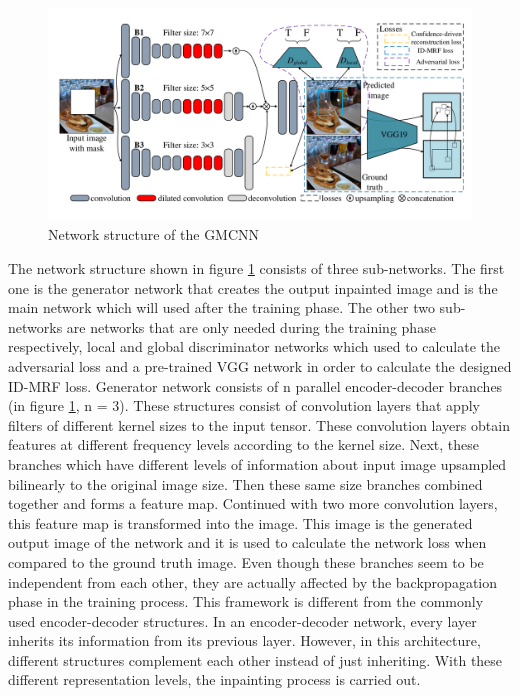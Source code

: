 \begin{figure}[h!]
    \centering
    \includegraphics[width=14cm]{figures/chapter4/gmcnn.png}
    \caption{Network structure of the GMCNN \cite{inpainting_via_multi_cnn}}
    \label{fig:gmcnn}
\end{figure}

The network structure shown in figure \ref{fig:gmcnn} consists of three sub-networks. The first one is the generator network that creates the output inpainted image and is the main network which will used after the training phase. The other two sub-networks are networks that are only needed during the training phase respectively, local and global discriminator networks which used to calculate the adversarial loss and a pre-trained VGG network \cite{very_deep_conv} in order to calculate the designed ID-MRF loss. Generator network consists of n parallel encoder-decoder branches (in figure \ref{fig:gmcnn}, n = 3). These structures consist of convolution layers that apply filters of different kernel sizes to the input tensor. These convolution layers obtain features at different frequency levels according to the kernel size. Next, these branches which have different levels of information about input image upsampled bilinearly to the original image size. Then these same size branches combined together and forms a feature map. Continued with two more convolution layers, this feature map is transformed into the image. This image is the generated output image of the network and it is used to calculate the network loss when compared to the ground truth image. Even though these branches seem to be independent from each other, they are actually affected by the backpropagation phase in the training process. This framework is different from the commonly used encoder-decoder structures. In an encoder-decoder network, every layer inherits its information from its previous layer. However, in this architecture, different structures complement each other instead of just inheriting. With these different representation levels, the inpainting process is carried out.

